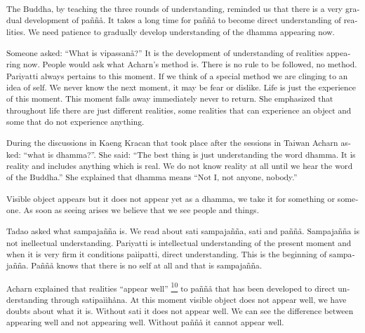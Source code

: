 \textsuperscript{\textdutch{T}\textenglish[variant=american]{he
Buddha}\textdutch{, by teaching the three rounds of understanding,
reminded us that there is a very gradual development of paññå. It takes
a long time for paññå to become direct understanding of realities.
}\textenglish[variant=american]{We need patience to gradually develop
understanding of the dhamma appearing now.}}

\textsuperscript{\textdutch{Someone asked: ``What is vipassanå?'' It is
the development of understanding of realities appearing now. People
would ask what Acharn's method is. There is no rule to be followed, no
method. Pariyatti always pertains to this moment. If we think of a
special method we are clinging to an idea of self. We never know the
next moment, it may be fear or dislike. Life is just the experience of
this moment. This moment falls away immediately never to return. She
emphasized that throughout life there are just different realities, some
realities that can experience an object and some that do not experience
anything.}}

\textsuperscript{\textdutch{During the discussions in Kaeng Kracan that
took place after the sessions in Taiwan Acharn asked: ``what is
dhamma?''. She said: ``The best thing is just understanding the word
dhamma. It is reality and includes anything which is real. We do not
know reality at all until we hear the word of the Buddha.'' She
explained that dhamma means ``Not I, not anyone, nobody.'' }}

\textsuperscript{\textdutch{Visible object appears but it does not
appear yet as a dhamma, we take it for something or someone. As soon as
seeing arises we believe that we see people and things. }}

\textsuperscript{\textdutch{Tadao asked what sampajañña is. We read
about sati sampajañña, sati and paññå. Sampajañña is not inellectual
understanding. Pariyatti is intellectual understanding of the present
moment and when it is very firm it conditions paìipatti, direct
understanding. This is the beginning of sampajañña. Paññå knows that
there is no self at all and that is sampajañña.}}

\textsuperscript{\textdutch{Acharn explained that realities ``appear
well'' \protect\hyperlink{sdfootnote10sym}{\textsuperscript{10}} to
paññå that has been developed to direct understanding through
satipaììhåna. At this moment visible object does not appear well, we
have doubts about what it is. Without sati it does not appear well. We
can see the difference between appearing well and not appearing well.
Without paññå it cannot appear well. }}

